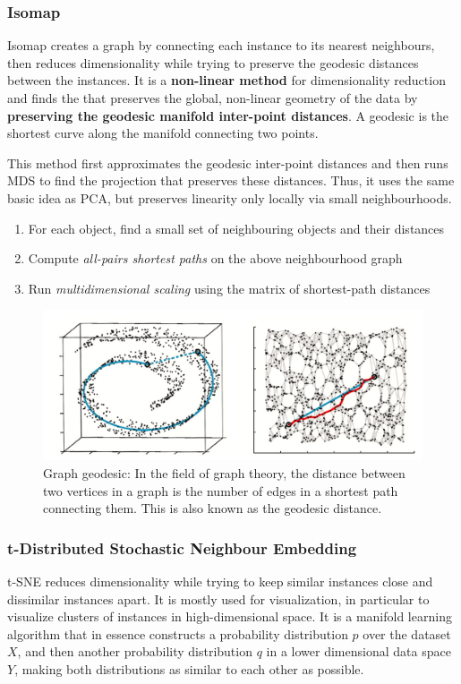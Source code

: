 \documentclass[11pt]{article}
\theoremstyle{definition}
\begin{document}
\subsubsection{Isomap}
Isomap creates a graph by connecting each instance to its nearest neighbours, then reduces dimensionality while trying to preserve the geodesic distances between the instances. It is a \textbf{non-linear method} for dimensionality reduction and finds the that preserves the global, non-linear geometry of the data by \textbf{preserving the geodesic manifold inter-point distances}. A geodesic is the shortest curve along the manifold connecting two points.

This method first approximates the geodesic inter-point distances and then runs MDS to find the projection that preserves these distances. Thus, it uses the same basic idea as PCA, but preserves linearity only locally via small neighbourhoods.

\begin{enumerate}
	\item For each object, find a small set of neighbouring objects and their distances
	\item Compute \emph{all-pairs shortest paths} on the above neighbourhood graph
	\item Run \emph{multidimensional scaling} using the matrix of shortest-path distances
\end{enumerate}

\begin{figure}[H]
	\centering
	\includegraphics[width=0.8\linewidth]{img/isomap}
	\caption{Graph geodesic: In the field of graph theory, the distance between two vertices in a graph is the number of edges in a shortest path connecting them. This is also known as the geodesic distance.}
	\label{fig:isomap}
\end{figure}

\subsubsection{t-Distributed Stochastic Neighbour Embedding}
t-SNE reduces dimensionality while trying to keep similar instances close and dissimilar instances apart. It is mostly used for visualization, in particular to visualize clusters of instances in high-dimensional space. It is a manifold learning algorithm that in essence constructs a probability distribution $p$ over the dataset $X$, and then another probability distribution $q$ in a lower dimensional data space $Y$, making both distributions as similar to each other as possible.
\end{document}
